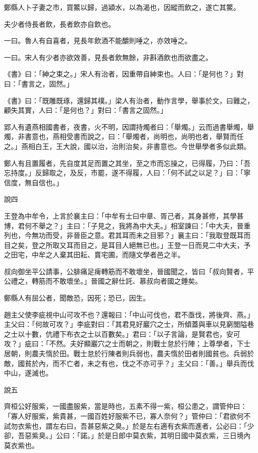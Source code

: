 \begin{pinyinscope}
鄭縣人卜子妻之市，買鱉以歸，過潁水，以為渴也，因縱而飲之，遂亡其鱉。

夫少者侍長者飲，長者飲亦自飲也。

一曰。魯人有自喜者，見長年飲酒不能釂則唾之，亦效唾之。

一曰。宋人有少者亦欲效善，見長者飲無餘，非斟酒飲也而欲盡之。

《書》曰：「紳之束之。」宋人有治者，因重帶自紳束也。人曰：「是何也？」對曰：「書言之，固然。」

《書》曰：「既雕既琢，還歸其樸。」梁人有治者，動作言學，舉事於文，曰難之，顧失其實，人曰：「是何也？」對曰：「書言之固然。」

郢人有遺燕相國書者，夜書，火不明，因謂持燭者曰：「舉燭。」云而過書舉燭，舉燭，非書意也，燕相受書而說之，曰：「舉燭者，尚明也，尚明也者，舉賢而任之。」燕相白王，王大說，國以治，治則治矣，非書意也。今世舉學者多似此類。

鄭人有且置履者，先自度其足而置之其坐，至之市而忘操之，已得履，乃曰：「吾忘持度。」反歸取之，及反，市罷，遂不得履，人曰：「何不試之以足？」曰：「寧信度，無自信也。」

說四

王登為中牟令，上言於襄主曰：「中牟有士曰中章、胥己者，其身甚修，其學甚博，君何不舉之？」主曰：「子見之，我將為中大夫。」相室諫曰：「中大夫，晉重列也，今無功而受，非晉臣之意。君其耳而未之目邪？」襄主曰：「我取登既耳而目之矣，登之所取又耳而目之，是耳目人絕無已也。」王登一日而見二中大夫，予之田宅，中牟之人棄其田耘、賣宅圃，而隨文學者邑之半。

叔向御坐平公請事，公腓痛足痺轉筋而不敢壞坐，晉國聞之，皆曰「叔向賢者，平公禮之，轉筋而不敢壞坐。」晉國之辭仕託、慕叔向者國之錘矣。

鄭縣人有屈公者，聞敵恐，因死；恐已，因生。

趙主父使李疵視中山可攻不也？還報曰：「中山可伐也，君不亟伐，將後齊、燕。」主父曰：「何故可攻？」李疵對曰：「其君見好巖穴之士，所傾蓋與車以見窮閭隘巷之士以十數，伉禮下布衣之士以百數矣。」君曰：「以子言論，是賢君也，安可攻？」疵曰：「不然。夫好顯巖穴之士而朝之，則戰士怠於行陣；上尊學者，下士居朝，則農夫惰於田。戰士怠於行陳者則兵弱也，農夫惰於田者則國貧也。兵弱於敵，國貧於內，而不亡者，未之有也，伐之不亦可乎？」主父曰：「善。」舉兵而伐中山，遂滅也。

說五

齊桓公好服紫，一國盡服紫，當是時也，五素不得一紫，桓公患之，謂管仲曰：「寡人好服紫，紫貴甚，一國百姓好服紫不已，寡人奈何？」管仲曰：「君欲何不試勿衣紫也，謂左右曰，吾甚惡紫之臭。」於是左右適有衣紫而進者，公必曰：「少卻，吾惡紫臭。」公曰：「諾。」於是日郎中莫衣紫，其明日國中莫衣紫，三日境內莫衣紫也。


\end{pinyinscope}

